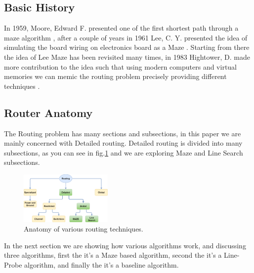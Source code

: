 \subsection{Basic History}
    In 1959, Moore, Edward F. presented one of the first shortest path through a maze algorithm
    \cite{MooreRef}, after a couple of years in 1961 Lee, C. Y. presented the idea of simulating the 
    board wiring on electronics board as a Maze \cite{LeeRef}. Starting from there the idea of Lee Maze
    has been revisited many times, in 1983 Hightower, D. made more contribution to the idea such that
    using modern computers and virtual memories we can memic the routing problem precisely providing 
    different techniques \cite{HightowerRef}.
\subsection{Router Anatomy}
    The Routing problem has many sections and subsections, in this paper we are mainly concerned with
    Detailed routing. Detailed routing is divided into many subsections, as you can see in fig.\ref{fig:routing_anat} 
    and we are exploring Maze and Line Search subsections.

    \begin{figure}[H]
        \centering
        \includegraphics[width=0.4\textwidth]{figures/routing_anatomy.png}
        \caption{Anatomy of various routing techniques.}
        \label{fig:routing_anat}
    \end{figure}

    In the next section we are showing how various algorithms work, and discussing three 
    algorithms, first the  it's a Maze based algorithm, second the 
     it's a Line-Probe algorithm, and finally the  
    it's a baseline algorithm.

